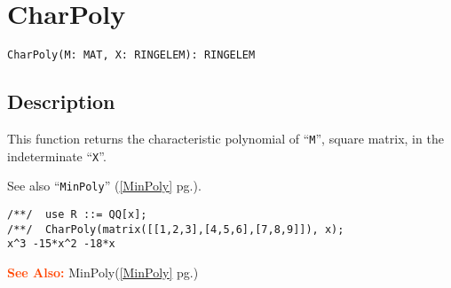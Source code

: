 \documentclass[a4paper]{mybook}
\newenvironment{command}{}{} %
\newcommand\SeeAlso{\par\textcolor{OrangeRed}{\textbf{\large See Also: }}}
\begin{document}
\section{CharPoly}
\label{CharPoly}
\begin{command} %


\begin{Verbatim}[label=syntax, rulecolor=\color{MidnightBlue},
frame=single]
CharPoly(M: MAT, X: RINGELEM): RINGELEM
\end{Verbatim}


\subsection*{Description}

This function returns the characteristic polynomial of ``\verb&M&'',
square matrix, in the indeterminate ``\verb&X&''.
\par 
See also ``\verb&MinPoly&'' (\ref{MinPoly} pg.\pageref{MinPoly}).
\begin{Verbatim}[label=example, rulecolor=\color{PineGreen}, frame=single]
/**/  use R ::= QQ[x];
/**/  CharPoly(matrix([[1,2,3],[4,5,6],[7,8,9]]), x);
x^3 -15*x^2 -18*x
\end{Verbatim}


\SeeAlso %
  MinPoly(\ref{MinPoly} pg.\pageref{MinPoly})
\end{command} %
\end{document}
